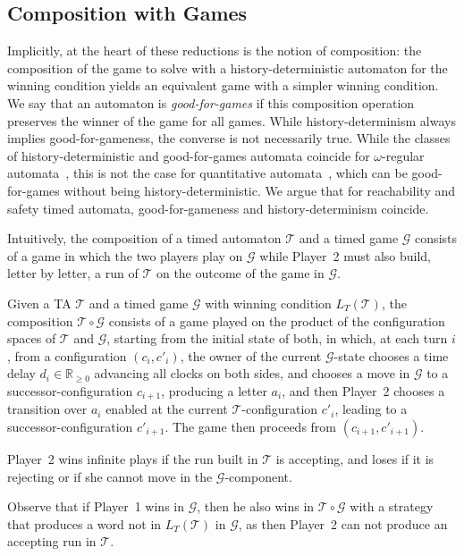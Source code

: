 \documentclass[10pt,a4paper]{amsart}
\theoremstyle{definition}
\numberwithin{equation}{section}
\newcommand{\nnreals}{{\mathbb R}_{\geq 0}}
\newcommand{\T}{\mathcal{T}}
\newcommand{\gsgame}{\mathcal{G}}
\newcommand{\comp}[2]{#2\circ #1}
\newcommand{\lang}{L_T}  %
\begin{document}
\subsection{Composition with Games}

Implicitly, at the heart of these reductions is the notion of composition: the composition of the game to solve with a history-deterministic automaton for the winning condition yields an equivalent game with a simpler winning condition. We say that an automaton is \emph{good-for-games} if this composition operation preserves the winner of the game for all games. While history-determinism always implies good-for-gameness, the converse is not necessarily true. While the classes of history-deterministic and good-for-games automata coincide for $\omega$-regular automata~\cite{BL19}, this is not the case for quantitative automata~\cite{BL21}, which can be good-for-games without being history-deterministic. We argue that for reachability and safety timed automata, good-for-gameness and history-determinism coincide.



Intuitively, the composition of a timed automaton $\T$ and a timed game $\gsgame$ 
consists of a game in which the two players play on $\gsgame$ while Player~2 must also build, letter by letter, a run of $\T$ on the outcome of the game in $\gsgame$.

\begin{definition}[Composition]
Given a  TA $\T$ and a timed game $\gsgame$ with winning condition $\lang(\T)$, the composition $\comp{\gsgame}{\T}$ consists of a game played on the product of the configuration spaces of $\T$ and $\gsgame$, starting from the initial state of both, in which, at each turn $i$, from a configuration $(c_i,c'_i)$, 
the owner of the current $\gsgame$-state chooses a time delay $d_i\in \nnreals$ advancing all clocks on both sides, and chooses a move in $\gsgame$ to a successor-configuration $c_{i+1}$, producing a letter $a_i$,
and then Player~2 chooses a transition over $a_i$ enabled at the current $\T$-configuration $c'_i$, leading to a successor-configuration $c'_{i+1}$. The game then proceeds from $(c_{i+1},c'_{i+1})$.

Player~2 wins infinite plays if the run built in $\T$ is accepting, and loses if it is rejecting or if she cannot move in the $\gsgame$-component.

\end{definition}
Observe that if Player~1 wins in $\gsgame$, then he also wins in $\comp{\gsgame}{\T}$ with a strategy that produces a word not in $\lang(\T)$ in $\gsgame$, as then Player~2 can not produce an accepting run in $\T$.
\end{document}
